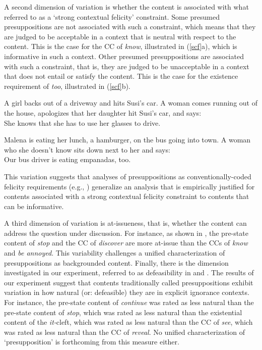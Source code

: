 \documentclass[11pt,fleqn]{article}
\def\infelic{{\leavevmode\llap{\#}}}
\newcommand{\6}{\mbox{$[\hspace*{-.6mm}[$}}
\newcommand{\9}{\mbox{$]\hspace*{-.6mm}]$}}
\begin{document}
A second dimension of variation is whether the content is associated with what \citealt*{brst-lang11} referred to as a `strong contextual felicity' constraint. Some presumed presuppositions are not associated with such a constraint, which means that they are judged to be acceptable in a context that is neutral with respect to the content. This is the case for the CC of {\em know}, illustrated in (\ref{scf}a), which is informative in such a context. Other presumed presuppositions are associated with such a constraint, that is, they are judged to be unacceptable in a context that does not entail or satisfy the content. This is the case for the existence requirement of {\em too}, illustrated in (\ref{scf}b).

\begin{exe}
\ex\label{scf} \citealt[78, 80]{brst-lang11}
\begin{xlist}
\ex A girl backs out of a driveway and hits Susi's car. A woman comes running out of the house, apologizes that her daughter hit Susi's car, and says: \\ She knows that she has to use her glasses to drive.

\ex Malena is eating her lunch, a hamburger, on the bus going into town. A woman who she doesn't know sits down next to her and says:
\\ \infelic Our bus driver is eating empanadas, too.

\end{xlist}
\end{exe}
This variation suggests that analyses of presuppositions as conventionally-coded felicity requirements (e.g., \citealt{heim83,vds92}) generalize an analysis that is empirically justified for contents associated with a strong contextual felicity constraint to contents that can be informative. 

A third dimension of variation is at-issueness, that is, whether the content can address the question under discussion. For instance, as shown in \citealt{tbd-variability}, the pre-state content of {\em stop} and the CC of {\em discover} are more at-issue than the CCs of {\em know} and {\em be annoyed}. This variability challenges a unified characterization of presuppositions as backgrounded content. Finally, there is the dimension investigated in our experiment, referred to as defeasibility in \citealt{simons01} and \citealt{abusch10}. The results of our experiment suggest that contents traditionally called presuppositions exhibit variation in how natural (or: defeasible) they are in explicit ignorance contexts. For instance,  the pre-state content of {\em continue} was rated as less natural than the pre-state content of {\em stop}, which was rated as less natural than the existential content of the {\em it-}cleft, which was rated as less natural than the CC of {\em see}, which was rated as less natural than the CC of {\em reveal}. No unified characterization of `presupposition' is forthcoming from this measure either.
\end{document}
